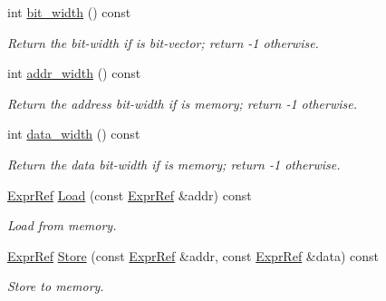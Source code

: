 \begin{DoxyCompactItemize}
int \mbox{\hyperlink{classilang_1_1_expr_ref_a5ec639324c61ffdc978be68e06a2b2ea}{bit\+\_\+width}} () const
\begin{DoxyCompactList}\small\item\em Return the bit-\/width if is bit-\/vector; return -\/1 otherwise. \end{DoxyCompactList}\item 
\mbox{\label{classilang_1_1_expr_ref_a70500e3eb92b6838ec6738da6762cbd8}} 
int \mbox{\hyperlink{classilang_1_1_expr_ref_a70500e3eb92b6838ec6738da6762cbd8}{addr\+\_\+width}} () const
\begin{DoxyCompactList}\small\item\em Return the address bit-\/width if is memory; return -\/1 otherwise. \end{DoxyCompactList}\item 
\mbox{\label{classilang_1_1_expr_ref_a5cca6024ab4c204c1d5c017a3aea1171}} 
int \mbox{\hyperlink{classilang_1_1_expr_ref_a5cca6024ab4c204c1d5c017a3aea1171}{data\+\_\+width}} () const
\begin{DoxyCompactList}\small\item\em Return the data bit-\/width if is memory; return -\/1 otherwise. \end{DoxyCompactList}\item 
\mbox{\label{classilang_1_1_expr_ref_ae0de7e0d65d971b726f64991fde2504d}} 
\mbox{\hyperlink{classilang_1_1_expr_ref}{Expr\+Ref}} \mbox{\hyperlink{classilang_1_1_expr_ref_ae0de7e0d65d971b726f64991fde2504d}{Load}} (const \mbox{\hyperlink{classilang_1_1_expr_ref}{Expr\+Ref}} \&addr) const
\begin{DoxyCompactList}\small\item\em Load from memory. \end{DoxyCompactList}\item 
\mbox{\label{classilang_1_1_expr_ref_aadf3615adc5d09341e88db3b172cde5a}} 
\mbox{\hyperlink{classilang_1_1_expr_ref}{Expr\+Ref}} \mbox{\hyperlink{classilang_1_1_expr_ref_aadf3615adc5d09341e88db3b172cde5a}{Store}} (const \mbox{\hyperlink{classilang_1_1_expr_ref}{Expr\+Ref}} \&addr, const \mbox{\hyperlink{classilang_1_1_expr_ref}{Expr\+Ref}} \&data) const
\begin{DoxyCompactList}\small\item\em Store to memory. \end{DoxyCompactList}\item 

\end{DoxyCompactItemize}
